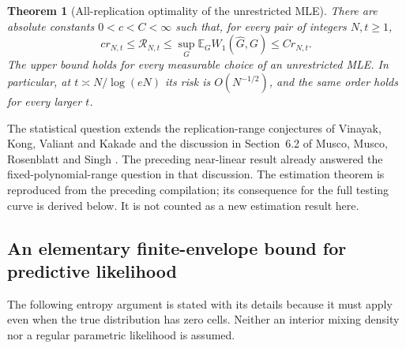 \documentclass[11pt,a4paper]{article}
\newtheorem{theorem}{Theorem}[section]
\theoremstyle{definition}
\theoremstyle{remark}
\numberwithin{equation}{section}
\begin{document}
\begin{theorem}[All-replication optimality of the unrestricted MLE]
\label{E:p06:bm:full}
There are absolute constants $0<c<C<\infty$ such that, for every pair of
integers $N,t\ge1$,
\begin{equation}\label{E:p06:bm:fullrate}
 c r_{N,t}\le \mathcal R_{N,t}
 \le \sup_G\mathbb E_G W_1(\widehat G,G)
 \le C r_{N,t}.
\end{equation}
The upper bound holds for every measurable choice of an unrestricted MLE.
In particular, at $t\asymp N/\log(eN)$ its risk is $O(N^{-1/2})$,
and the same order holds for every larger $t$.
\end{theorem}

The statistical question extends the replication-range conjectures of
Vinayak, Kong, Valiant and Kakade \cite{BT_VKVK2019} and the discussion
in Section~6.2 of Musco, Musco, Rosenblatt and Singh
\cite{BT_MMRS2025}. The preceding near-linear result already answered the
fixed-polynomial-range question in that discussion. The estimation theorem is reproduced from the preceding compilation;
its consequence for the full testing curve is derived below. It is not
counted as a new estimation result here.

\subsection{An elementary finite-envelope bound for predictive likelihood}

The following entropy argument is stated with its details because it
must apply even when the true distribution has zero cells. Neither an
interior mixing density nor a regular parametric likelihood is assumed.
\end{document}
